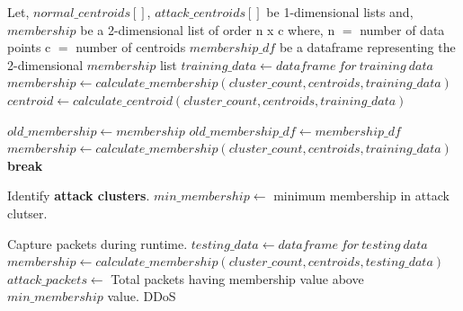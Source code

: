 \documentclass[12pt,a4paper,final]{report}
\begin{document}
\begin{algorithm}
\begin{algorithmic}[1]
\State Let, $normal\_centroids[]$, $attack\_centroids[]$ be 1-dimensional lists and,
\State $ membership $ be a 2-dimensional list of order n x c
\newline
\hspace*{1cm}
where, 
\newline
\hspace*{1cm}
n $=$ number of data points
\newline
\hspace*{1cm}
c $=$ number of centroids
\State $ membership\_df $ be a dataframe representing the 2-dimensional $membership$ list
\State $training\_data \leftarrow dataframe\ for\ training\ data $
\State $membership \leftarrow calculate\_membership(cluster\_count, centroids, training\_data)$
\State $centroid \leftarrow calculate\_centroid(cluster\_count, centroids, training\_data)$

\State $old\_membership \leftarrow membership$
\State $old\_membership\_df \leftarrow membership\_df$
\State $membership \leftarrow calculate\_membership(cluster\_count, centroids, training\_data)$
\State \textbf{break}
\EndIf
\EndWhile

\State Identify \textbf{attack clusters}.
\State $min\_membership \leftarrow$ minimum membership in attack clutser.

\State Capture packets during runtime.
\State $testing\_data \leftarrow dataframe\ for\ testing\ data$
\State $membership \leftarrow calculate\_membership(cluster\_count, centroids, testing\_data)$
\State $attack\_packets \leftarrow $ Total packets having membership value above $min\_membership$ value.
\State \Return DDoS
\EndIf
\EndWhile
\EndFunction
\end{algorithmic}
\end{algorithm}

\begin{minipage}{\textwidth}
\end{minipage}

\newpage
{}
\end{document}
